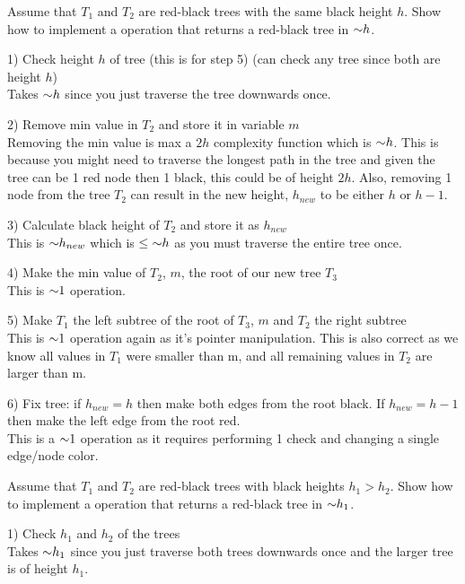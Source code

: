 \begin{problem}
\begin{questions}
\item Assume that $T_1$ and $T_2$ are red-black trees with the same black height $h$. Show how to implement a  operation that returns a red-black tree in $\mathord{\sim}h$.

1) Check height $h$ of tree (this is for step 5) (can check any tree since both are height $h$)\\
Takes $\mathord{\sim}h$ since you just traverse the tree downwards once.

2) Remove min value in $T_2$ and store it in variable $m$\\
Removing the min value is max a $2h$ complexity function which is $\mathord{\sim}h$. This is because you might need to traverse the longest path in the tree and given the tree can be 1 red node then 1 black, this could be of height $2h$.
Also, removing 1 node from the tree $T_2$ can result in the new height, $h_{new}$ to be either $h$ or $h-1$.

3) Calculate black height of $T_2$ and store it as $h_{new}$\\
This is $\mathord{\sim}h_{new}$ which is $\leq \mathord{\sim}h$ as you must traverse the entire tree once. 

4) Make the min value of $T_2$, $m$, the root of our new tree $T_3$\\
This is $\mathord{\sim}1$ operation.

5) Make $T_1$ the left subtree of the root of $T_3$, $m$ and $T_2$ the right subtree\\
This is $\mathord{\sim}1$ operation again as it's pointer manipulation. 
This is also correct as we know all values in $T_1$ were smaller than m, and all remaining values in $T_2$ are larger than m.

6) Fix tree: if $h_{new} = h$ then make both edges from the root black. If $h_{new} = h-1$ then make the left edge from the root red.\\
This is a $\mathord{\sim}1$ operation as it requires performing 1 check and changing a single edge/node color. 

\item Assume that $T_1$ and $T_2$ are red-black trees with black heights $h_1 > h_2$. Show how to implement a  operation that returns a red-black tree in $\mathord{\sim}h_1$.

1) Check $h_1$ and $h_2$ of the trees\\
Takes $\mathord{\sim}h_1$ since you just traverse both trees downwards once and the larger tree is of height $h_1$.


\end{questions}
\end{problem}

